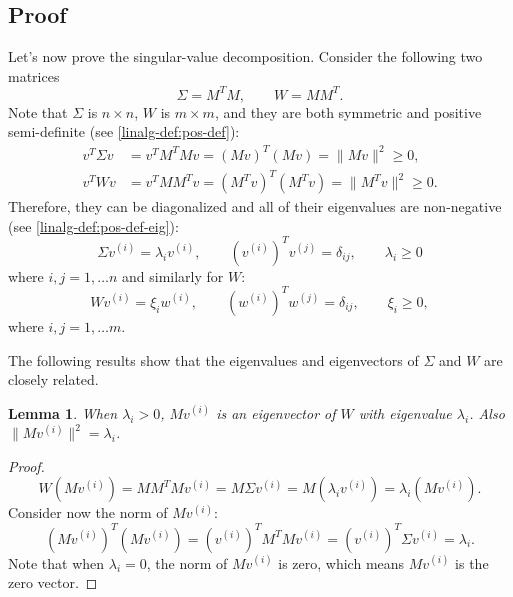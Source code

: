 \documentclass{article}
\newtheorem{lemma}[theorem]{Lemma}
\theoremstyle{definition}
\begin{document}
\subsection{Proof}
Let's now prove the singular-value decomposition. Consider the following two matrices
\begin{equation}
    \Sigma = M^TM, \qquad W = MM^T.
\end{equation}
Note that $\Sigma$ is $n\times n$, $W$ is $m\times m$, and they are both symmetric and positive semi-definite (see \ref{linalg-def:pos-def}):
\begin{align*}
    v^T\Sigma v &= v^TM^TMv = (Mv)^T(Mv) = \lVert Mv \rVert^2 \ge 0,\\
    v^TWv &= v^TMM^Tv = (M^Tv)^T(M^Tv) = \lVert M^Tv \rVert^2 \ge 0.
\end{align*}
Therefore, they can be diagonalized and all of their eigenvalues are non-negative (see \ref{linalg-def:pos-def-eig}):
\begin{equation}
    \Sigma v^{(i)} = \lambda_i v^{(i)}, \qquad
    (v^{(i)})^T v^{(j)} = \delta_{ij}, \qquad
    \lambda_i \ge 0
\end{equation}
where $i,j=1,\dots n$ and similarly for $W$:
\begin{equation}
    W v^{(i)} = \xi_i w^{(i)}, \qquad
    (w^{(i)})^T w^{(j)} = \delta_{ij}, \qquad
    \xi_i \ge 0,
\end{equation}
where $i,j=1,\dots m$.

The following results show that the eigenvalues and eigenvectors of $\Sigma$ and $W$ are closely related.

\begin{lemma}
\label{svd-lemma:mv}
When $\lambda_i > 0$, $Mv^{(i)}$ is an eigenvector of $W$ with eigenvalue $\lambda_i$. Also $\lVert Mv^{(i)} \rVert^2 =  \lambda_i$.
\end{lemma}
\begin{proof}
\begin{equation}
    W(Mv^{(i)}) = MM^TMv^{(i)} =M\Sigma v^{(i)} = M(\lambda_iv^{(i)}) = \lambda_i(Mv^{(i)}).
\end{equation}
Consider now the norm of $Mv^{(i)}$:
\begin{equation}
    (Mv^{(i)})^T(Mv^{(i)}) = (v^{(i)})^TM^TMv^{(i)} = (v^{(i)})^T\Sigma v^{(i)} = \lambda_i.
\end{equation}
Note that when $\lambda_i=0$, the norm of $Mv^{(i)}$ is zero, which means $Mv^{(i)}$ is the zero vector.
\end{proof}
\end{document}
